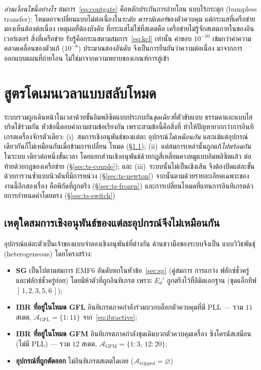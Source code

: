 \documentclass[12pt,a4paper]{article}
\begin{document}
\emph{อ่านเงื่อนไขนี้อย่างไร} สมการ~\eqref{eq:contgate} คือหลักประกันการถ่ายโอน
แบบไร้กระตุก (bumpless transfer): โหมดอาจเปลี่ยนแบบไม่ต่อเนื่องใน\emph{ระดับ
พารามิเตอร์}ของตัวควบคุม แต่กระแสที่เครือข่ายมองเห็นต้องต่อเนื่อง เหตุผลที่ต้องบังคับ
ที่กระแสไม่ใช่ที่สเตตคือ เครือข่ายไม่รู้จักสเตตภายในของอินเวอร์เตอร์ สิ่งที่เครือข่าย
รับรู้คือกระแสตามสมการ~\eqref{eq:kcl} เท่านั้น ค่าขอบ $10^{-10}$ เข้มกว่าค่าความ
คลาดเคลื่อนของตัวแก้ ($10^{-8}$) ประมาณสองอันดับ จึงเป็นการยืนยันว่าความต่อเนื่อง
มาจากการออกแบบแผนที่ถ่ายโอน ไม่ใช่มาจากความหยาบของเกณฑ์การลู่เข้า

\section{สูตรโดเมนเวลาแบบสลับโหมด}\label{sec:ts}
ระบบรวมถูกเดินหน้าในเวลาด้วยขั้นอิมพลิซิตแบบประกบกัน\emph{ชุดเดียว}ที่ตัวขับแบบ
ธรรมดาและแบบไฮบริดใช้ร่วมกัน หัวข้อนี้ตอบคำถามสามข้อเรียงกัน เพราะสามข้อนี้คือสิ่งที่
ทำให้ปัญหายากกว่าการอินทิเกรตเครื่องจักรตัวเดียว: (i)~สมการเชิงอนุพันธ์ของแต่ละ
อุปกรณ์\emph{ไม่เหมือนกัน} และแม้แต่อุปกรณ์เดียวกันก็ไม่เหมือนกันเมื่อข้ามการเปลี่ยน
โหมด (\S\ref{sec:ts-hetero}); (ii)~แต่สมการเหล่านั้นถูกแก้\emph{ไปพร้อมกัน}ในระบบ
เดียวต่อหนึ่งขั้นเวลา โดยแยกส่วนเชิงอนุพันธ์ด้วยกฎสี่เหลี่ยมคางหมูแบบอิมพลิซิตแล้ว
ต่อท้ายด้วยกฎของเครือข่าย (\S\ref{sec:ts-couple}); และ (iii)~ระบบนั้นไม่เป็นเชิงเส้น
จึงต้องปิดแต่ละขั้นด้วยการวนซ้ำแบบนิวตันที่มีการหน่วง (\S\ref{sec:ts-newton})
จากนั้นตามด้วยรายละเอียดเฉพาะของงานนี้อีกสองเรื่อง คือพิกัดที่ถูกตรึง
(\S\ref{sec:ts-frozen}) และการเปลี่ยนโหมดที่แทนการอินทิเกรตด้วยการกำหนดค่าโดยตรง
(\S\ref{sec:ts-switch})

\subsection{เหตุใดสมการเชิงอนุพันธ์ของแต่ละอุปกรณ์จึงไม่เหมือนกัน}\label{sec:ts-hetero}
อุปกรณ์แต่ละตัวเป็นเจ้าของแบบจำลองเชิงอนุพันธ์ที่ต่างกัน ด้านขวามือของระบบจึงเป็น
แบบวิวิธพันธุ์ (heterogeneous) โดยโครงสร้าง:
\begin{itemize}\itemsep2pt
  \item \textbf{SG} เป็นไปตามสมการ EMF6 อันดับหกในหัวข้อ~\ref{sec:sg} (คู่สมการ
        การแกว่ง ฟลักซ์ชั่วครู่ และฟลักซ์ชั่วครู่ย่อย) โดยมีห้าตัวที่ถูกอินทิเกรต
        เพราะ $E_d'$ ถูกตรึงไว้ที่ลิมิตเอกฐาน (ชุดแอ็กทีฟ $[\,1,2,3,5,6\,]$);
  \item \textbf{IBR ที่อยู่ในโหมด GFL} อินทิเกรตภาคกำลังร่วมบวกบล็อกตัวควบคุมที่มี
        PLL --- รวม $11$ สเตต, $\mathcal{A}_{\mathrm{GFL}}=\{1{:}11\}$
        จาก~\eqref{eq:ibractive};
  \item \textbf{IBR ที่อยู่ในโหมด GFM} อินทิเกรตภาคกำลังชุดเดิมบวกตัวควบคุมเครื่อง
        ซิงโครนัสเสมือน (ไม่มี PLL) --- รวม $12$ สเตต,
        $\mathcal{A}_{\mathrm{GFM}}=\{1{:}3,\,12{:}20\}$;
  \item \textbf{อุปกรณ์ที่ถูกตัดออก} ไม่อินทิเกรตสเตตใดเลย
        ($\mathcal{A}_{\mathrm{tripped}}=\varnothing$)
\end{itemize}
\end{document}
